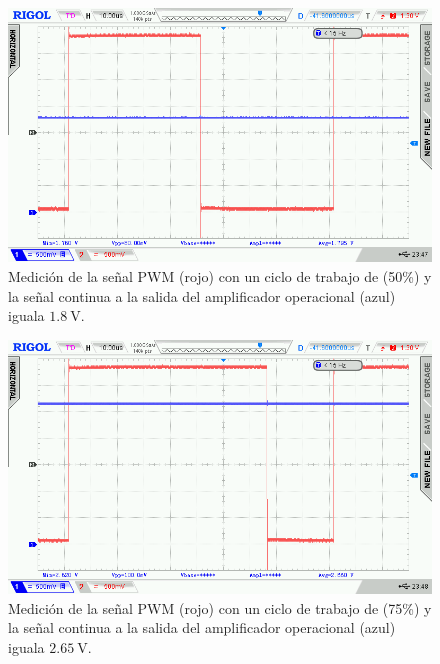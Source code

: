 \begin{figure}[H]
    \centering
    \includegraphics[width=0.9\linewidth]{Figuras/datalogger/Hardware/MedicionesPWM/127.png}
    \caption{Medición de la señal PWM (rojo) con un ciclo de trabajo de (50\%) y la señal continua a la salida del amplificador operacional (azul) iguala $\SI{1.8}{\volt}$. }
    \label{fig:127}
\end{figure}


\begin{figure}[H]
    \centering
    \includegraphics[width=0.9\linewidth]{Figuras/datalogger/Hardware/MedicionesPWM/191.png}
    \caption{Medición de la señal PWM (rojo) con un ciclo de trabajo de (75\%) y la señal continua a la salida del amplificador operacional (azul) iguala $\SI{2.65}{\volt}$.}
    \label{fig:191}
\end{figure}


